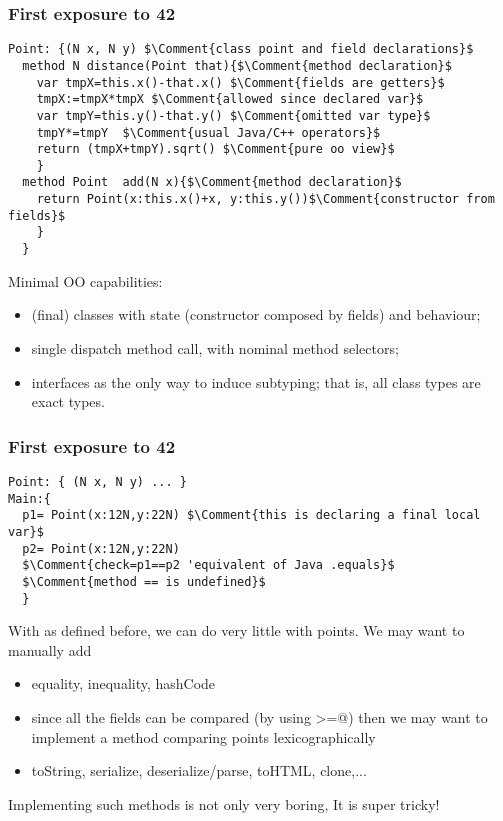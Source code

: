 
\begin{frame}[fragile]
\frametitle{First exposure to 42}
\begin{NiceCode}{59ex}{0.8}
\begin{lstlisting}
Point: {(N x, N y) $\Comment{class point and field declarations}$
  method N distance(Point that){$\Comment{method declaration}$
    var tmpX=this.x()-that.x() $\Comment{fields are getters}$
    tmpX:=tmpX*tmpX $\Comment{allowed since declared var}$
    var tmpY=this.y()-that.y() $\Comment{omitted var type}$
    tmpY*=tmpY  $\Comment{usual Java/C++ operators}$
    return (tmpX+tmpY).sqrt() $\Comment{pure oo view}$
    }
  method Point  add(N x){$\Comment{method declaration}$
    return Point(x:this.x()+x, y:this.y())$\Comment{constructor from fields}$
    }
  }
\end{lstlisting}
\end{NiceCode}

Minimal OO capabilities:
\begin{itemize}
\item (final) classes with state (constructor composed by fields) and behaviour;
\item single dispatch method call, with nominal method selectors;
\item interfaces as the only way to induce subtyping; that is, all class types are exact types.
\end{itemize}

\end{frame}

\begin{frame}[fragile]
\frametitle{First exposure to 42}
\begin{NiceCode}{59ex}{0.8}
\begin{lstlisting}
Point: { (N x, N y) ... }
Main:{
  p1= Point(x:12N,y:22N) $\Comment{this is declaring a final local var}$
  p2= Point(x:12N,y:22N)
  $\Comment{check=p1==p2 'equivalent of Java .equals}$
  $\Comment{method == is undefined}$
  }
\end{lstlisting}
\end{NiceCode}

With \Q@Point@ as defined before, we can do very little with points.
We may want to manually add
\begin{itemize}
\item equality, inequality, hashCode
\item since all the fields can be compared  (by using \Q@>=@) then
we may want to implement a method comparing points lexicographically
\item toString, serialize, deserialize/parse, toHTML, clone,...
\end{itemize}
Implementing such methods is not only very boring,
\PresentationOnly\pause\alert{It is super tricky!}

\end{frame}

